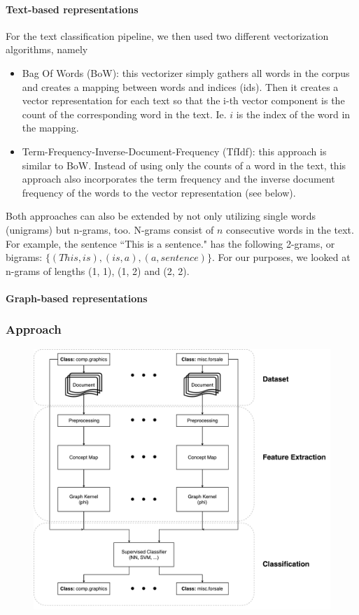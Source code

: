 \paragraph{Text-based representations}
For the text classification pipeline, we then used two different vectorization algorithms, namely
\begin{itemize}
\item{Bag Of Words (BoW): this vectorizer simply gathers all words in the corpus and creates a mapping between words and indices (ids). Then it creates a vector representation for each text so that the i-th vector component  is the count of the corresponding word in the text. Ie. $i$ is the index of the word in the mapping.}
\item{Term-Frequency-Inverse-Document-Frequency (TfIdf): this approach is similar to BoW. Instead of using only the counts of a word in the text, this approach also incorporates the term frequency and the inverse document frequency of the words to the vector representation (see below).}
\end{itemize}
Both approaches can also be extended by not only utilizing single words (unigrams) but n-grams, too. N-grams consist of $n$ consecutive words in the text.
For example, the sentence ``This is a sentence." has the following 2-grams, or bigrams: $\{ (This, is), (is, a), (a, sentence) \}$.
For our purposes, we looked at n-grams of lengths (1, 1), (1, 2) and (2, 2).


\paragraph{Graph-based representations}


\subsubsection{Approach}

\begin{figure}[ht]
\centering\includegraphics[width=0.6\linewidth]{assets/figures/approach.pdf}
\caption{}
\end{figure}

